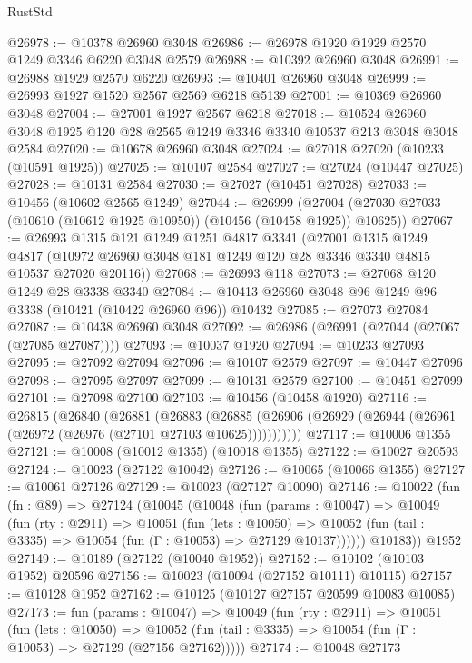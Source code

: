 \begin{lexlean}{RustStd}
\begin{coremodule}
@26978 := @10378 @26960 @3048
@26986 := @26978 @1920 @1929 @2570 @1249 @3346 @6220 @3048 @2579
@26988 := @10392 @26960 @3048
@26991 := @26988 @1929 @2570 @6220
@26993 := @10401 @26960 @3048
@26999 := @26993 @1927 @1520 @2567 @2569 @6218 @5139
@27001 := @10369 @26960 @3048
@27004 := @27001 @1927 @2567 @6218
@27018 := @10524 @26960 @3048 @1925 @120 @28 @2565 @1249 @3346 @3340 @10537 @213 @3048 @3048 @2584
@27020 := @10678 @26960 @3048
@27024 := @27018 @27020 (@10233 (@10591 @1925))
@27025 := @10107 @2584
@27027 := @27024 (@10447 @27025)
@27028 := @10131 @2584
@27030 := @27027 (@10451 @27028)
@27033 := @10456 (@10602 @2565 @1249)
@27044 := @26999
    (@27004 (@27030 @27033 (@10610 (@10612 @1925 @10950)) (@10456 (@10458 @1925)) @10625))
@27067 := @26993
    @1315
    @121
    @1249
    @1251
    @4817
    @3341
    (@27001
      @1315
      @1249
      @4817
      (@10972 @26960 @3048 @181 @1249 @120 @28 @3346 @3340 @4815 @10537 @27020 @20116))
@27068 := @26993 @118
@27073 := @27068 @120 @1249 @28 @3338 @3340
@27084 := @10413 @26960 @3048 @96 @1249 @96 @3338 (@10421 (@10422 @26960 @96)) @10432
@27085 := @27073 @27084
@27087 := @10438 @26960 @3048
@27092 := @26986 (@26991 (@27044 (@27067 (@27085 @27087))))
@27093 := @10037 @1920
@27094 := @10233 @27093
@27095 := @27092 @27094
@27096 := @10107 @2579
@27097 := @10447 @27096
@27098 := @27095 @27097
@27099 := @10131 @2579
@27100 := @10451 @27099
@27101 := @27098 @27100
@27103 := @10456 (@10458 @1920)
@27116 := @26815
    (@26840
      (@26881
        (@26883
          (@26885 (@26906 (@26929 (@26944 (@26961 (@26972 (@26976 (@27101 @27103 @10625)))))))))))
@27117 := @10006 @1355
@27121 := @10008 (@10012 @1355) (@10018 @1355)
@27122 := @10027 @20593
@27124 := @10023 (@27122 @10042)
@27126 := @10065 (@10066 @1355)
@27127 := @10061 @27126
@27129 := @10023 (@27127 @10090)
@27146 := @10022
    (fun (fn : @89) =>
    @27124
      (@10045
        (@10048
          (fun (params : @10047) =>
          @10049
            (fun (rty : @2911) =>
            @10051
              (fun (lets : @10050) =>
              @10052 (fun (tail : @3335) => @10054 (fun (Γ : @10053) => @27129 @10137))))))
        @10183))
    @1952
@27149 := @10189 (@27122 (@10040 @1952))
@27152 := @10102 (@10103 @1952) @20596
@27156 := @10023 (@10094 (@27152 @10111) @10115)
@27157 := @10128 @1952
@27162 := @10125 (@10127 @27157 @20599 @10083 @10085)
@27173 := fun (params : @10047) =>
  @10049
    (fun (rty : @2911) =>
    @10051
      (fun (lets : @10050) =>
      @10052 (fun (tail : @3335) => @10054 (fun (Γ : @10053) => @27129 (@27156 @27162)))))
@27174 := @10048 @27173

\end{coremodule}
\end{lexlean}
